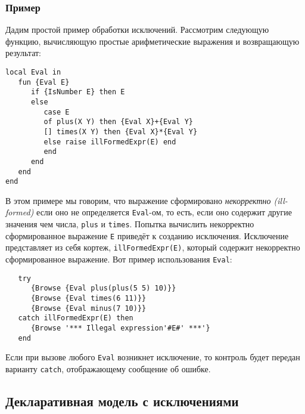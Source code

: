 \subsubsection{Пример}

Дадим простой пример обработки исключений. Рассмотрим следующую функцию, вычисляющую простые арифметические выражения и возвращающую результат:

\begin{lstlisting}
local Eval in
   fun {Eval E}
      if {IsNumber E} then E
      else
         case E
         of plus(X Y) then {Eval X}+{Eval Y}
         [] times(X Y) then {Eval X}*{Eval Y}
         else raise illFormedExpr(E) end
         end
      end
   end
end
\end{lstlisting}

В этом примере мы говорим, что выражение сформировано \emph{некорректно (ill-formed)} если оно не определяется \lstinline|Eval|-ом, то есть, если оно содержит другие значения чем числа, \lstinline|plus| и \lstinline|times|. Попытка вычислить некорректно сформированное выражение \lstinline|E| приведёт к созданию исключения. Исключение представляет из себя кортеж, \lstinline|illFormedExpr(E)|, который содержит некорректно сформированное выражение. Вот пример использования \lstinline|Eval|:

\begin{lstlisting}
   try
      {Browse {Eval plus(plus(5 5) 10)}}
      {Browse {Eval times(6 11)}}
      {Browse {Eval minus(7 10)}}
   catch illFormedExpr(E) then
      {Browse '*** Illegal expression'#E#' ***'}
   end
\end{lstlisting}

Если при вызове любого \lstinline|Eval| возникнет исключение, то контроль будет передан варианту \lstinline|catch|, отображающему сообщение об ошибке.

\subsection{Декларативная модель с исключениями}

